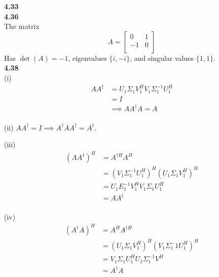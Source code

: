 \documentclass[letterpaper,12pt]{article}
\theoremstyle{definition}
\begin{document}
\noindent\textbf{4.33}\\

\noindent\textbf{4.36}\\
The matrix
\[A = \begin{bmatrix} 
0 & 1\\
-1 & 0\\
\end{bmatrix}\]
Has $\det(A) = -1$, eigenvalues $\{i, -i \}$, and singular values $\{1, 1\}$.\\

\noindent\textbf{4.38}\\
(i) \begin{align*}
AA^\dagger &= U_1\Sigma_1V_1^HV_1\Sigma_1^{-1}U_1^H\\
&= I\\
&\implies AA^\dagger A = A
\end{align*}\\

\noindent(ii) $AA^\dagger = I \implies A^\dagger A A^\dagger = A^\dagger$.

\noindent(iii) \begin{align*}
(AA^\dagger)^H &= A^{\dagger H}A^H\\
&= (V_1\Sigma_1^{-1}U_1^H)^H(U_1\Sigma_1V_1^H)^H\\
&= U_1E_1^{-1}V_1^HV_1\Sigma_1U_1^H\\
&=AA^\dagger
\end{align*}\\

\noindent (iv)\begin{align*}
(A^\dagger A)^H &= A^HA^{\dagger H}\\
&= (U_1\Sigma_1V_1^H)^H(V_1 \Sigma_1^-1U_1^H)^H\\
&= V_1\Sigma_1U_1^HU_1\Sigma_1^{-1}V^H\\
&= A^\dagger A
\end{align*}
\end{document}

